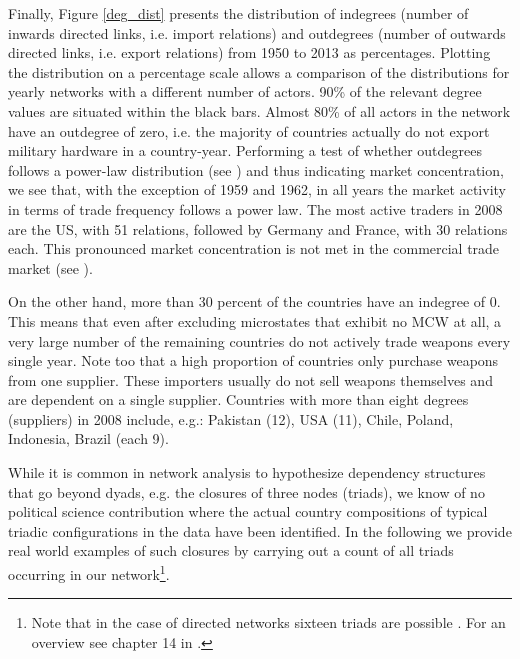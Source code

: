 \documentclass[12pt, letterpaper]{article}
\numberwithin{equation}{section}
\begin{document}
Finally, Figure \ref{deg_dist} presents the distribution of indegrees (number of inwards directed links, i.e. import relations) and outdegrees (number of outwards directed links, i.e. export relations) from 1950 to 2013 as percentages.
Plotting the distribution on a percentage scale allows a comparison of the distributions for yearly networks with a different number of actors. 90\% of the relevant degree values are situated within the black bars. Almost 80\% of all actors in the network have an outdegree of zero, i.e. the majority of countries actually do not export military hardware in a country-year. Performing a test of whether outdegrees follows a power-law distribution (see \cite{Clauset:2009}) and thus indicating market concentration, we see that, with the exception of 1959 and 1962, in all years the market activity in terms of trade frequency follows a power law. The most active traders in 2008 are the US, with 51 relations, followed by Germany and France, with 30 relations each. 
This pronounced market concentration is not met in the commercial trade market (see \cite{WaAhAr:13}).    

On the other hand, more than 30 percent of the countries have an indegree of $0$. This means that even after excluding microstates that exhibit no MCW at all, a very large number of the remaining countries do not actively trade weapons every single year. Note too that a high proportion of countries only purchase weapons from one supplier. These importers usually do not sell weapons themselves and are dependent on a single supplier. Countries with more than eight degrees (suppliers) in 2008 include, e.g.: Pakistan (12), USA (11), Chile, Poland, Indonesia, Brazil (each 9). 


While it is common in network analysis to hypothesize dependency structures that go beyond dyads, e.g. the closures of three nodes (triads), we know of no political science contribution where the actual country compositions of typical triadic configurations in the data have been identified. In the following we provide real world examples of such closures by carrying out a count of all triads occurring in our network\footnote{Note that in the case of directed networks sixteen triads are possible \citep{DavisLeinhardt:72}. For an overview see chapter 14 in \cite{Wasserman:94}.}. 
\end{document}
